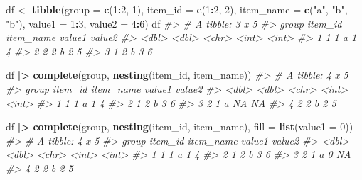 \documentclass[
]{book}
\newenvironment{Shaded}{\begin{snugshade}}{\end{snugshade}}
\newcommand{\AttributeTok}[1]{\textcolor[rgb]{0.13,0.29,0.53}{#1}}
\newcommand{\CommentTok}[1]{\textcolor[rgb]{0.56,0.35,0.01}{\textit{#1}}}
\newcommand{\DecValTok}[1]{\textcolor[rgb]{0.00,0.00,0.81}{#1}}
\newcommand{\FunctionTok}[1]{\textcolor[rgb]{0.13,0.29,0.53}{\textbf{#1}}}
\newcommand{\NormalTok}[1]{#1}
\newcommand{\OtherTok}[1]{\textcolor[rgb]{0.56,0.35,0.01}{#1}}
\newcommand{\SpecialCharTok}[1]{\textcolor[rgb]{0.81,0.36,0.00}{\textbf{#1}}}
\newcommand{\StringTok}[1]{\textcolor[rgb]{0.31,0.60,0.02}{#1}}
\begin{document}
\begin{Shaded}
\begin{Highlighting}[]
\NormalTok{df }\OtherTok{\textless{}{-}} \FunctionTok{tibble}\NormalTok{(}\AttributeTok{group =} \FunctionTok{c}\NormalTok{(}\DecValTok{1}\SpecialCharTok{:}\DecValTok{2}\NormalTok{, }\DecValTok{1}\NormalTok{),}
             \AttributeTok{item\_id =} \FunctionTok{c}\NormalTok{(}\DecValTok{1}\SpecialCharTok{:}\DecValTok{2}\NormalTok{, }\DecValTok{2}\NormalTok{),}
             \AttributeTok{item\_name =} \FunctionTok{c}\NormalTok{(}\StringTok{"a"}\NormalTok{, }\StringTok{"b"}\NormalTok{, }\StringTok{"b"}\NormalTok{),}
             \AttributeTok{value1 =} \DecValTok{1}\SpecialCharTok{:}\DecValTok{3}\NormalTok{,}
             \AttributeTok{value2 =} \DecValTok{4}\SpecialCharTok{:}\DecValTok{6}\NormalTok{)}
\NormalTok{df}
\CommentTok{\#\textgreater{} \# A tibble: 3 x 5}
\CommentTok{\#\textgreater{}   group item\_id item\_name value1 value2}
\CommentTok{\#\textgreater{}   \textless{}dbl\textgreater{}   \textless{}dbl\textgreater{} \textless{}chr\textgreater{}      \textless{}int\textgreater{}  \textless{}int\textgreater{}}
\CommentTok{\#\textgreater{} 1     1       1 a              1      4}
\CommentTok{\#\textgreater{} 2     2       2 b              2      5}
\CommentTok{\#\textgreater{} 3     1       2 b              3      6}
  
\NormalTok{df }\SpecialCharTok{|\textgreater{}} \FunctionTok{complete}\NormalTok{(group, }\FunctionTok{nesting}\NormalTok{(item\_id, item\_name))}
\CommentTok{\#\textgreater{} \# A tibble: 4 x 5}
\CommentTok{\#\textgreater{}   group item\_id item\_name value1 value2}
\CommentTok{\#\textgreater{}   \textless{}dbl\textgreater{}   \textless{}dbl\textgreater{} \textless{}chr\textgreater{}      \textless{}int\textgreater{}  \textless{}int\textgreater{}}
\CommentTok{\#\textgreater{} 1     1       1 a              1      4}
\CommentTok{\#\textgreater{} 2     1       2 b              3      6}
\CommentTok{\#\textgreater{} 3     2       1 a             NA     NA}
\CommentTok{\#\textgreater{} 4     2       2 b              2      5}

\NormalTok{df }\SpecialCharTok{|\textgreater{}} \FunctionTok{complete}\NormalTok{(group, }\FunctionTok{nesting}\NormalTok{(item\_id, item\_name), }
                 \AttributeTok{fill =} \FunctionTok{list}\NormalTok{(}\AttributeTok{value1 =} \DecValTok{0}\NormalTok{))}
\CommentTok{\#\textgreater{} \# A tibble: 4 x 5}
\CommentTok{\#\textgreater{}   group item\_id item\_name value1 value2}
\CommentTok{\#\textgreater{}   \textless{}dbl\textgreater{}   \textless{}dbl\textgreater{} \textless{}chr\textgreater{}      \textless{}int\textgreater{}  \textless{}int\textgreater{}}
\CommentTok{\#\textgreater{} 1     1       1 a              1      4}
\CommentTok{\#\textgreater{} 2     1       2 b              3      6}
\CommentTok{\#\textgreater{} 3     2       1 a              0     NA}
\CommentTok{\#\textgreater{} 4     2       2 b              2      5}


\end{Highlighting}
\end{Shaded}
\end{document}
